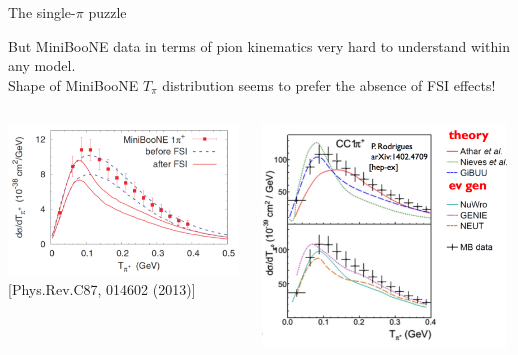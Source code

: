 %
%
%
\begin{frame}{The single-$\pi$ puzzle}

{\scriptsize
 But MiniBooNE data in terms of pion kinematics very hard to understand within any model.\\
 \vspace{0.3cm}
 Shape of MiniBooNE $T_{\pi}$ distribution seems to prefer the absence of FSI effects!\\
}

  \begin{columns}
    \begin{column}{0.60\textwidth}
      \begin{center}
        \includegraphics[width=0.99\textwidth]{./images/nuint/ccpi/mb_cc1pip_w_wo_fsi.png}\\
        {\scriptsize [Phys.Rev.C87, 014602 (2013)]}
      \end{center}
    \end{column}
    \begin{column}{0.40\textwidth}
      \begin{center}
         \includegraphics[width=0.98\textwidth]{./images/nuint/ccpi/mb_cc1pi_many_models.png}\\

\end{center}
\end{column}
\end{columns}
\end{frame}
